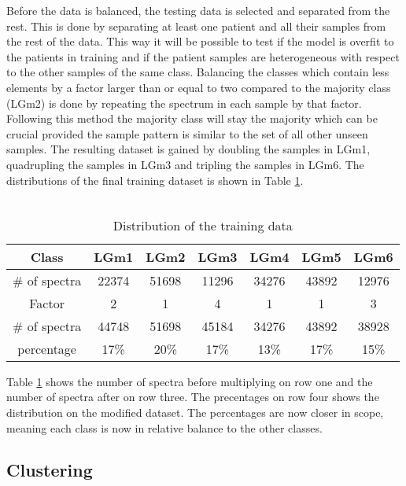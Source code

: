 Before the data is balanced, the testing data is selected and separated from the rest. This is done by separating at least one patient and all their samples from the rest of the data. This way it will be possible to test if the model is overfit to the patients in training and if the patient samples are heterogeneous with respect to the other samples of the same class. Balancing the classes which contain less elements by a factor larger than or equal to two compared to the majority class (LGm2) is done by repeating the spectrum in each sample by that factor. Following this method the majority class will stay the majority which can be crucial provided the sample pattern is similar to the set of all other unseen samples. The resulting dataset is gained by doubling the samples in LGm1, quadrupling the samples in LGm3 and tripling the samples in LGm6. The distributions of the final training dataset is shown in Table \ref{table:3}.
\\
\\
\begin{table}[htb]
\centering
 \begin{tabular}{||c c c c c c c||} 
 \hline
 Class & LGm1 & LGm2 & LGm3 & LGm4 & LGm5 & LGm6 \\ [0.5ex] 
 \hline\hline
\# of spectra & 22374	& 51698	& 11296	& 34276	& 43892	& 12976 \\
 \hline 
 Factor  & 2 & 1 & 4 & 1 & 1 & 3 \\
 \hline 
 \# of spectra & 44748 & 51698 & 45184 & 34276 & 43892 & 38928 \\
 \hline
 percentage & 17\%& 20\% & 17\% & 13\% & 17\% & 15\% \\
 \hline

\end{tabular}
\caption{Distribution of the training data}
\label{table:3}
\end{table}

Table \ref{table:3} shows the number of spectra before multiplying on row one and the number of spectra after on row three. The precentages on row four shows the distribution on the modified dataset. The percentages are now closer in scope,  meaning each class is now in relative balance to the other classes.

\subsection{Clustering}

